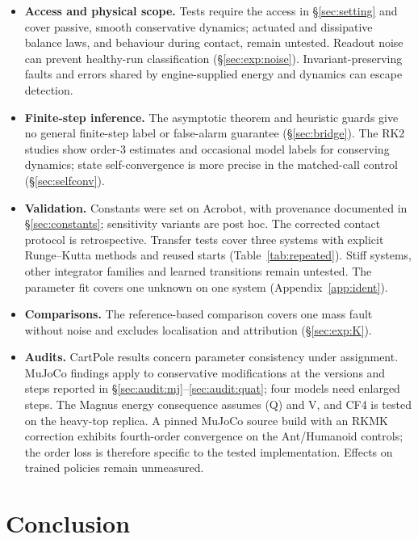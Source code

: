\documentclass[10pt]{article}
\theoremstyle{definition}
\begin{document}
\begin{itemize}[leftmargin=1.2em]
\item \textbf{Access and physical scope.} Tests require the access in \S\ref{sec:setting} and cover passive, smooth conservative dynamics;
actuated and dissipative balance laws, and behaviour during contact, remain
untested. Readout noise can prevent healthy-run classification
(\S\ref{sec:exp:noise}). Invariant-preserving faults and errors shared by
engine-supplied energy and dynamics can escape detection.
\item \textbf{Finite-step inference.} The asymptotic theorem and heuristic
guards give no general finite-step label or false-alarm guarantee
(\S\ref{sec:bridge}). The RK2 studies show order-3 estimates and occasional
model labels for conserving dynamics; state self-convergence is more precise
in the matched-call control (\S\ref{sec:selfconv}).
\item \textbf{Validation.} Constants were set on Acrobot, with provenance
documented in \S\ref{sec:constants}; sensitivity variants are post hoc.
The corrected contact protocol is retrospective. Transfer tests cover three
systems with explicit Runge--Kutta methods and reused starts
(Table~\ref{tab:repeated}). Stiff systems, other integrator families and learned
transitions remain untested. The parameter fit covers one unknown on one
system (Appendix~\ref{app:ident}).
\item \textbf{Comparisons.} The reference-based comparison covers one mass
fault without noise and excludes localisation and attribution
(\S\ref{sec:exp:K}).
\item \textbf{Audits.} CartPole results concern parameter consistency under
assignment. MuJoCo findings apply to conservative modifications at the
versions and steps reported in \S\ref{sec:audit:mj}--\ref{sec:audit:quat};
four models need enlarged steps. The Magnus energy consequence assumes (Q)
and V, and CF4 is tested on the heavy-top replica. A pinned MuJoCo source
build with an RKMK correction exhibits fourth-order convergence on the
Ant/Humanoid controls; the order loss is therefore specific to the tested implementation.
Effects on trained policies remain unmeasured.
\end{itemize}

\section{Conclusion}
\end{document}
